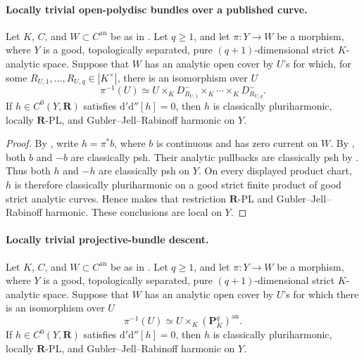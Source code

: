 \paragraph{Locally trivial open-polydisc bundles over a published curve.}
\begin{corollary}
\label{cor:p062-open-disc-bundles-over-curves}
\label{cor:p062-open-polydisc-bundles-over-curves}
Let \(K\), \(C\), and \(W\subset C^{\mathrm{an}}\) be as in
.  Let \(q\geq1\), and let
\(\pi:Y\to W\) be a morphism, where \(Y\) is a good, topologically
separated, pure \((q+1)\)-dimensional strict \(K\)-analytic space.  Suppose
that \(W\) has an analytic open cover by \(U\)'s for which, for some
\(R_{U,1},\ldots,R_{U,q}\in|K^\times|\), there is an isomorphism over \(U\)
\[
              \pi^{-1}(U)\simeq
              U\times_KD_{R_{U,1}}^-\times_K\cdots\times_KD_{R_{U,q}}^-.
\]
If \(h\in C^0(Y,\mathbf R)\) satisfies
\(\mathrm d'\mathrm d''[h]=0\), then \(h\) is classically
pluriharmonic, locally \(\mathbf R\)-PL, and Gubler--Jell--Rabinoff
harmonic on \(Y\).
\end{corollary}

\begin{proof}
By , write \(h=\pi^*b\), where
\(b\) is continuous and has zero current on \(W\).  By
, both \(b\) and \(-b\)
are classically psh.  Their analytic pullbacks are classically psh by
\cite[Proposition~4.2(6)]{GR25Classical}.  Thus both \(h\) and \(-h\)
are classically psh on \(Y\).  On every displayed product chart,
\(h\) is therefore classically pluriharmonic on a good strict finite
product of good strict analytic curves.  Hence
 makes that restriction
\(\mathbf R\)-PL and Gubler--Jell--Rabinoff harmonic.  These conclusions
are local on \(Y\).
\end{proof}

\paragraph{Locally trivial projective-bundle descent.}



\begin{corollary}
\label{cor:p062-projective-bundles-over-curves}
Let \(K\), \(C\), and \(W\subset C^{\mathrm{an}}\) be as in
.  Let \(q\geq1\), and let
\(\pi:Y\to W\) be a morphism, where \(Y\) is a good, topologically
separated, pure \((q+1)\)-dimensional strict \(K\)-analytic space.  Suppose
that \(W\) has an analytic open cover by \(U\)'s for which there is an
isomorphism over \(U\)
\[
       \pi^{-1}(U)\simeq U\times_K(\mathbf P^q_K)^{\mathrm{an}}.
\]
If \(h\in C^0(Y,\mathbf R)\) satisfies
\(\mathrm d'\mathrm d''[h]=0\), then \(h\) is classically
pluriharmonic, locally \(\mathbf R\)-PL, and Gubler--Jell--Rabinoff
harmonic on \(Y\).
\end{corollary}

